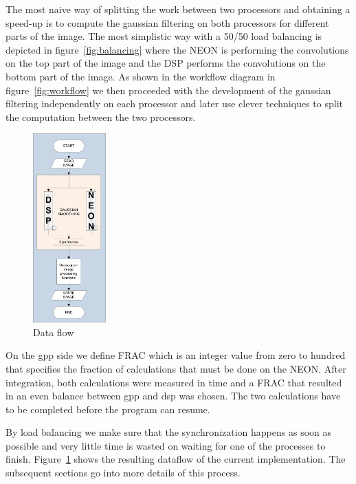 The most naive way of splitting the work between two processors and obtaining a speed-up is to compute the gaussian filtering on both processors for different parts of the image. The most simplistic way with a 50/50 load balancing is depicted in figure~\ref{fig:balancing} where the NEON is performing the convolutions on the top part of the image and the DSP performs the convolutions on the bottom part of the image. As shown in the workflow diagram in figure~\ref{fig:workflow} we then proceeded with the development of the gaussian filtering independently on each processor and later use clever techniques to split the computation between the two processors.

\begin{figure}
\centering
\includegraphics[width=0.25\textwidth]{drawings/model}
\caption{Data flow}
\label{fig:dataflow}
\end{figure}

On the gpp side we define FRAC which is an integer value from zero to hundred that specifies the fraction of calculations that must be done on the NEON. After integration, both calculations were measured in time and a FRAC that resulted in an even balance between gpp and dsp was chosen. The two calculations have to be completed before the program can resume.

By load balancing we make sure that the synchronization happens as soon as possible and very little time is wasted on waiting for one of the processes to finish. Figure~\ref{fig:dataflow} shows the resulting dataflow of the current implementation. The subsequent sections go into more details of this process.



